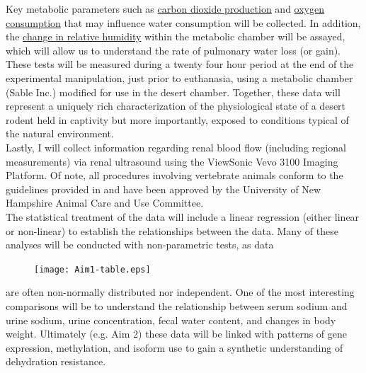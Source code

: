 Key metabolic parameters such as \ul{carbon dioxide production} and \ul{oxygen consumption} that may influence water consumption will be collected. In addition, the \ul{change in relative humidity} within the metabolic chamber will be assayed, which will allow us to understand the rate of pulmonary water loss (or gain). These tests will be measured during a twenty four hour period at the end of the experimental manipulation, just prior to euthanasia, using a metabolic chamber (Sable Inc.) modified for use in the desert chamber. Together, these data will represent a uniquely rich characterization of the physiological state of a desert rodent held in captivity but more importantly, exposed to conditions typical of the natural environment. \\

Lastly, I will collect information regarding renal blood flow (including regional measurements) via renal ultrasound using the ViewSonic Vevo 3100 Imaging Platform. Of note, all procedures involving vertebrate animals conform to the guidelines provided in \citep{Sikes:2011dz} and have been approved by the University of New Hampshire Animal Care and Use Committee. \\


The statistical treatment of the data will include a linear regression (either linear or non-linear) to establish the relationships between the data. Many of these analyses will be conducted with non-parametric tests, as data 

\begin{figure}
\hypertarget{Table 1}{}
\vspace{-5mm}
\begin{mdframed}
  \begin{center}
    \texttt{[image: Aim1-table.eps]}
  \end{center}
\end{mdframed}
\end{figure}

\noindent are often non-normally distributed nor independent. One of the most interesting comparisons will be to understand the relationship between serum sodium and urine sodium, urine concentration, fecal water content, and changes in body weight. Ultimately (e.g. Aim 2) these data will be linked with patterns of gene expression, methylation, and isoform use to gain a synthetic understanding of dehydration resistance. \\




